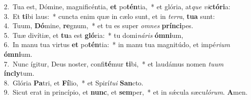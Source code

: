 {2.~}Tua est, Dómine, magnificéntia, \textbf{et} po\textbf{tén}tia,~* et glória, at\textit{que} \textit{vi}\textbf{ctó}\textbf{ri}a:\\
{3.~}Et \textbf{ti}bi laus:~* cuncta enim quæ in cælo sunt, et in \textit{ter}\textit{ra}, \textbf{tu}\textbf{a} sunt:\\
{4.~}Tuum, \textbf{Dó}mine, \textbf{re}gnum,~* et tu es super \textit{om}\textit{nes} \textbf{prín}\textbf{ci}pes.\\
{5.~}Tuæ divítiæ, et \textbf{tu}a est \textbf{gló}ria:~* tu domi\textit{ná}\textit{ris} \textbf{óm}\textbf{ni}um,\\
{6.~}In manu tua virtus \textbf{et} po\textbf{tén}tia:~* in manu tua magnitúdo, et impé\textit{ri}\textit{um} \textbf{óm}\textbf{ni}um.\\
{7.~}Nunc ígitur, Deus noster, confi\textbf{té}mur \textbf{ti}bi,~* et laudámus nomen \textit{tu}\textit{um} \textbf{ín}\textbf{cly}tum.\\
{8.~}Glória \textbf{Pa}tri, et \textbf{Fí}lio,~* et Spirí\textit{tu}\textit{i} \textbf{San}cto.\\
{9.~}Sicut erat in princípio, et \textbf{nunc}, et \textbf{sem}per,~* et in sǽcula sæcu\textit{ló}\textit{rum}. \textbf{A}men.\\
